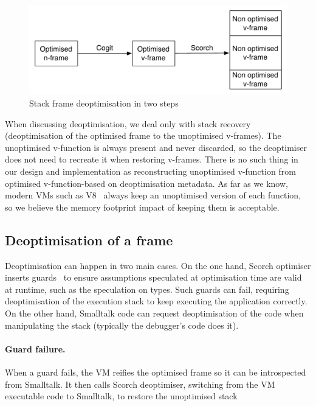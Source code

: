 \documentclass[a4paper,12pt,twoside]{../includes/ThesisStyle}
\begin{document}
\begin{figure}[h!]
    \begin{center}
        \includegraphics[width=0.8\linewidth]{SFDeoptimisation}
        \caption{Stack frame deoptimisation in two steps}
        \label{fig:SFDeoptimisation}
    \end{center}
\end{figure}

When discussing deoptimisation, we deal only with stack recovery (deoptimisation of the optimised frame to the unoptimised v-frames). The unoptimised v-function is always present and never discarded, so the deoptimiser does not need to recreate it when restoring v-frames. There is no such thing in our design and implementation as reconstructing unoptimised v-function from optimised v-function-based on deoptimisation metadata. As far as we know, modern VMs such as V8~\cite{V8} always keep an unoptimised version of each function, so we believe the memory footprint impact of keeping them is acceptable.

\subsection{Deoptimisation of a frame}

Deoptimisation can happen in two main cases. On the one hand, Scorch optimiser inserts guards~\cite{Holz92a} to ensure assumptions speculated at optimisation time are valid at runtime, such as the speculation on types. Such guards can fail, requiring deoptimisation of the execution stack to keep executing the application correctly. On the other hand, Smalltalk code can request deoptimisation of the code when manipulating the stack (typically the debugger's code does it).

\paragraph{Guard failure.} When a guard fails, the VM reifies the optimised frame so it can be introspected from Smalltalk. It then calls Scorch deoptimiser, switching from the VM executable code to Smalltalk, to restore the unoptimised stack
\end{document}
